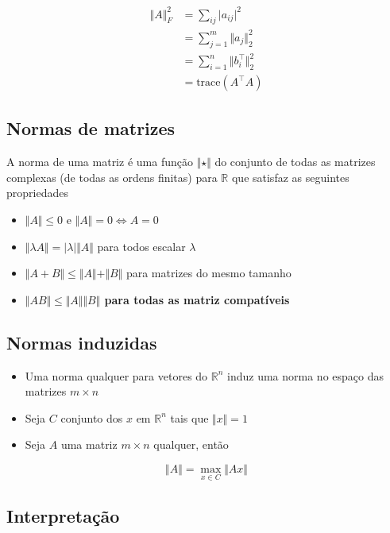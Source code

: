 \documentclass[
  letterpaper,
  DIV=11,
  numbers=noendperiod]{scrartcl}
\providecommand{\tightlist}{%
  \setlength{\itemsep}{0pt}\setlength{\parskip}{0pt}}\usepackage{longtable,booktabs,array}
\begin{document}
\begin{align}
\Vert A \Vert_F^2 &= \sum_{ij}\vert a_{ij}\vert^2\\
&= \sum_{j=1}^m \Vert a_j\Vert_2^2\\
&= \sum_{i=1}^n \Vert b_i^\top\Vert_2^2\\ 
&= \text{trace}(A^\top A)
\end{align}

\hypertarget{normas-de-matrizes}{%
\subsection{Normas de matrizes}\label{normas-de-matrizes}}

A norma de uma matriz é uma função \(\Vert \star\Vert\) do conjunto de
todas as matrizes complexas (de todas as ordens finitas) para
\(\mathbb R\) que satisfaz as seguintes propriedades

\begin{itemize}
\tightlist
\item
  \(\Vert A\Vert \le 0\) e \(\Vert A \Vert = 0 \Leftrightarrow A = 0\)
\item
  \(\Vert \lambda A\Vert = \vert \lambda\vert \Vert A \Vert\) para todos
  escalar \(\lambda\)
\item
  \(\Vert A + B \Vert \le \Vert A \Vert + \Vert B \Vert\) para matrizes
  do mesmo tamanho
\item
  \textbf{\(\Vert AB\Vert \le \Vert A \Vert \Vert B \Vert\) para todas
  as matriz compatíveis }
\end{itemize}

\hypertarget{normas-induzidas}{%
\subsection{Normas induzidas}\label{normas-induzidas}}

\begin{itemize}
\tightlist
\item
  Uma norma qualquer para vetores do \(\mathbb R^n\) induz uma norma no
  espaço das matrizes \(m\times n\)
\item
  Seja \(C\) conjunto dos \(x\) em \(\mathbb R^n\) tais que
  \(\Vert x \Vert = 1\)
\item
  Seja \(A\) uma matriz \(m\times n\) qualquer, então
\end{itemize}

\[ \Vert A \Vert = \max_{x\in C}{\Vert Ax\Vert}\]

\hypertarget{interpretauxe7uxe3o}{%
\subsection{Interpretação}\label{interpretauxe7uxe3o}}
\end{document}
